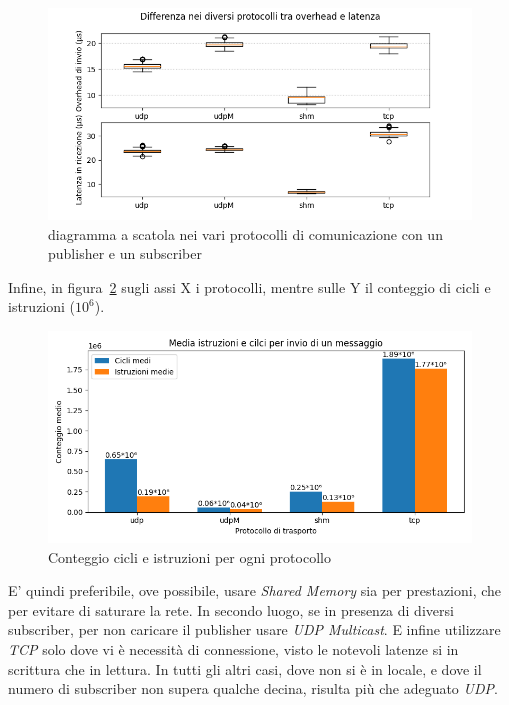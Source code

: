 \begin{figure}[H] %
    \includegraphics[width=\textwidth]{./results/test1_box_sr_1p1s.png} 
        \caption{diagramma a scatola nei vari protocolli di comunicazione con un publisher e un subscriber}\label{fig:test1sdbox}
\end{figure}
Infine, in figura~\ref{fig:test3_cycle_different_protocols} sugli assi X i protocolli, mentre sulle Y il conteggio di cicli e istruzioni ($10^6$).
\begin{figure}[H]
    \includegraphics[width=\textwidth]{./results/test1_cyclinstr.png} 
        \caption{Conteggio cicli e istruzioni per ogni protocollo}\label{fig:test3_cycle_different_protocols}%
\end{figure}
E' quindi preferibile, ove possibile, usare \emph{Shared Memory} sia per prestazioni, che per evitare di saturare la rete. In secondo luogo, se in presenza di diversi subscriber, per non caricare il publisher usare \emph{UDP Multicast}. E infine utilizzare \emph{TCP} solo dove vi è necessità di connessione, visto le notevoli latenze si in scrittura che in lettura. In tutti gli altri casi, dove non si è in locale, e dove il numero di subscriber non supera qualche decina, risulta più che adeguato \emph{UDP}.

